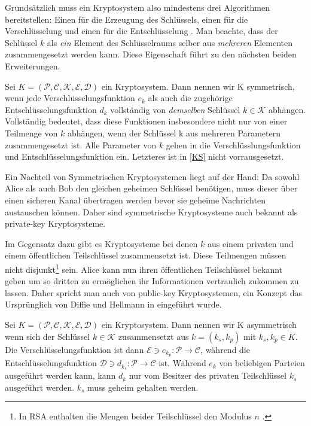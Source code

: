 Grundsätzlich muss ein Kryptosystem also mindestens drei Algorithmen bereitstellen: Einen für die Erzeugung des Schlüssels, einen für die Verschlüsselung und einen für die Entschlüsselung \cite{Cryptosy29:online}. Man beachte, dass der Schlüssel $k$ als \textit{ein} Element des Schlüsselraums selber aus \textit{mehreren} Elementen zusammengesetzt werden kann. Diese Eigenschaft führt zu den nächsten beiden Erweiterungen.

\begin{theorem}
	Sei $K = (\mathcal{P},\mathcal{C},\mathcal{K},\mathcal{E},\mathcal{D})$ ein Kryptosystem. Dann nennen wir K symmetrisch, wenn jede Verschlüsselungsfunktion $e_k$ als auch die zugehörige Entschlüsselungsfunktion $d_k$ vollständig von \textit{demselben} Schlüssel $k\in\mathcal{K}$ abhängen. Vollständig bedeutet, dass diese Funktionen insbesondere nicht nur von einer Teilmenge von $k$ abhängen, wenn der Schlüssel k aus mehreren Parametern zusammengesetzt ist. Alle Parameter von $k$ gehen in die Verschlüsslungsfunktion und Entschlüsselungsfunktion ein. Letzteres ist in \ref{KS} nicht vorrausgesetzt.
\end{theorem}

Ein Nachteil von Symmetrischen Kryptosystemen liegt auf der Hand: Da sowohl Alice als auch Bob den gleichen geheimen Schlüssel benötigen, muss dieser über einen sicheren Kanal übertragen werden bevor sie geheime Nachrichten austauschen können. Daher sind  symmetrische Kryptosysteme auch bekannt als private-key Kryptosysteme.

Im Gegensatz dazu gibt es Kryptosysteme bei denen $k$ aus einem privaten und einem öffentlichen Teilschlüssel zusammensetzt ist. Diese Teilmengen müssen nicht disjunkt\footnote{In RSA enthalten die Mengen beider Teilschlüssel den Modulus $n$ \cite[p.6]{rivest1978method}.} sein. Alice kann nun ihren öffentlichen Teilschlüssel bekannt geben um so dritten zu ermöglichen ihr Informationen vertraulich zukommen zu lassen. Daher spricht man auch von public-key Kryptosystemen, ein Konzept das Ursprünglich von Diffie und Hellmann in \cite[p.648]{diffie1976new} eingeführt wurde.

\begin{theorem}
	Sei $K = (\mathcal{P},\mathcal{C},\mathcal{K},\mathcal{E},\mathcal{D})$ ein Kryptosystem. Dann nennen wir K asymmetrisch wenn sich der Schlüssel $k\in\mathcal{K}$ zusammensetzt aus $k=(k_s, k_p)$ mit $k_s,k_p\in K$. Die Verschlüsselungsfunktion ist dann $\mathcal{E}\ni e_{k_p}:\mathcal{P}\rightarrow\mathcal{C}$, während die Entschlüsselungsfunktion $\mathcal{D}\ni d_{k_s}:\mathcal{P}\rightarrow\mathcal{C}$ ist. Während $e_k$ von beliebigen Parteien ausgeführt werden kann, kann $d_k$ nur vom Besitzer des privaten Teilschlüssel $k_s$ ausgeführt werden. $k_s$ muss geheim gehalten werden.
\end{theorem}

